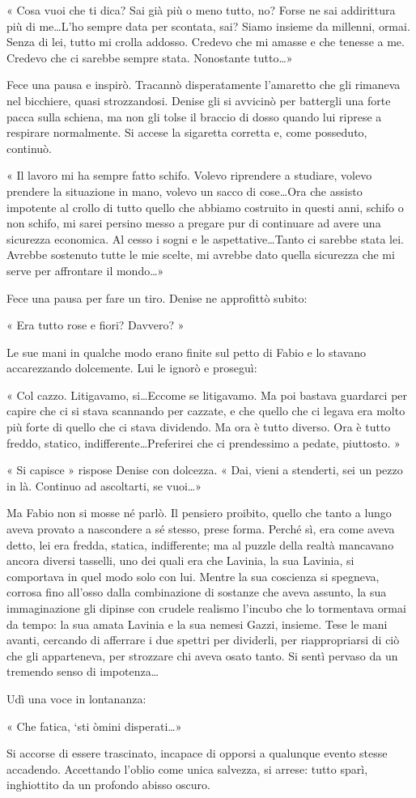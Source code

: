 « Cosa vuoi che ti dica? Sai già più o meno tutto, no? Forse ne sai addirittura più di me\ldots L'ho sempre data per scontata, sai? Siamo insieme da millenni, ormai. Senza di lei, tutto mi crolla addosso. Credevo che mi amasse e che tenesse a me. Credevo che ci sarebbe sempre stata. Nonostante tutto\ldots »

Fece una pausa e inspirò. Tracannò disperatamente l'amaretto che gli rimaneva nel bicchiere, quasi strozzandosi. Denise gli si avvicinò per battergli una forte pacca sulla schiena, ma non gli tolse il braccio di dosso quando lui riprese a respirare normalmente. Si accese la sigaretta corretta e, come posseduto, continuò.

« Il lavoro mi ha sempre fatto schifo. Volevo riprendere a studiare, volevo prendere la situazione in mano, volevo un sacco di cose\ldots Ora che assisto impotente al crollo di tutto quello che abbiamo costruito in questi anni, schifo o non schifo, mi sarei persino messo a pregare pur di continuare ad avere una sicurezza economica. Al cesso i sogni e le aspettative\ldots Tanto ci sarebbe stata lei. Avrebbe sostenuto tutte le mie scelte, mi avrebbe dato quella sicurezza che mi serve per affrontare il mondo\ldots »

Fece una pausa per fare un tiro. Denise ne approfittò subito:

« Era tutto rose e fiori? Davvero? »

Le sue mani in qualche modo erano finite sul petto di Fabio e lo stavano accarezzando dolcemente. Lui le ignorò e proseguì:

« Col cazzo. Litigavamo, si\ldots Eccome se litigavamo. Ma poi bastava guardarci per capire che ci si stava scannando per cazzate, e che quello che ci legava era molto più forte di quello che ci stava dividendo. Ma ora è tutto diverso. Ora è tutto freddo, statico, indifferente\ldots Preferirei che ci prendessimo a pedate, piuttosto. »

« Si capisce » rispose Denise con dolcezza. « Dai, vieni a stenderti, sei un pezzo in là. Continuo ad ascoltarti, se vuoi\ldots »

Ma Fabio non si mosse né parlò. Il pensiero proibito, quello che tanto a lungo aveva provato a nascondere a sé stesso, prese forma. Perché sì, era come aveva detto, lei era fredda, statica, indifferente; ma al puzzle della realtà mancavano ancora diversi tasselli, uno dei quali era che Lavinia, la sua Lavinia, si comportava in quel modo solo con lui. Mentre la sua coscienza si spegneva, corrosa fino all'osso dalla combinazione di sostanze che aveva assunto, la sua immaginazione gli dipinse con crudele realismo l'incubo che lo tormentava ormai da tempo: la sua amata Lavinia e la sua nemesi Gazzi, insieme. Tese le mani avanti, cercando di afferrare i due spettri per dividerli, per riappropriarsi di ciò che gli apparteneva, per strozzare chi aveva osato tanto. Si sentì pervaso da un tremendo senso di impotenza\ldots

Udì una voce in lontananza:

« Che fatica, `sti òmini disperati\ldots »

Si accorse di essere trascinato, incapace di opporsi a qualunque evento stesse accadendo. Accettando l'oblio come unica salvezza, si arrese: tutto sparì, inghiottito da un profondo abisso oscuro.
